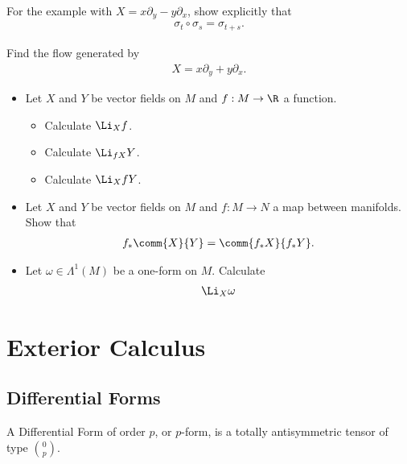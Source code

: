 \begin{Ebox}
  For the example with $X=x\partial_y -y\partial_x$, show explicitly that 
  \begin{align}
    \sigma_t\circ \sigma_s = \sigma_{t+s}.
  \end{align}
\end{Ebox}


\begin{Ebox}
  Find the flow generated by
  \begin{align}
    X = x\partial_y +y\partial_x.
  \end{align}
\end{Ebox}

\begin{Ebox}
  \begin{itemize}
  \item Let $X$ and $Y$ be vector fields on $M$ and $f:M\to\R$ a function.
    \begin{itemize}
    \item Calculate $\Li_{X}f$.
    \item Calculate $\Li_{fX}Y$.
    \item Calculate $\Li_{X}fY$.
    \end{itemize}
  \item  Let $X$ and $Y$ be vector fields on $M$ and $f:M\to N$ a map between manifolds. Show that
    \begin{align}
      f_*\comm{X}{Y} =\comm{f_*X}{f_*Y}.
    \end{align}
  \item Let $\omega\in\Lambda^1(M)$ be a one-form on $M$. Calculate
    \begin{align}
      \Li_X \omega
    \end{align}
  \end{itemize}
\end{Ebox}




\chapter{Exterior Calculus}

\section{Differential Forms}

\begin{Def}
  A {\sc Differential Form} of order $p$, or $p$-form, is a totally antisymmetric tensor of type $\binom{0}{p}$.
\end{Def}

